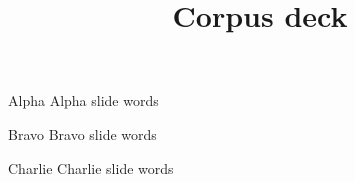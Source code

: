 \documentclass{beamer}
\title{Corpus deck}
\begin{document}
\begin{frame}{Alpha}
  Alpha slide words
\end{frame}
\begin{frame}{Bravo}
  Bravo slide words
\end{frame}
\begin{frame}{Charlie}
  Charlie slide words
\end{frame}
\end{document}
